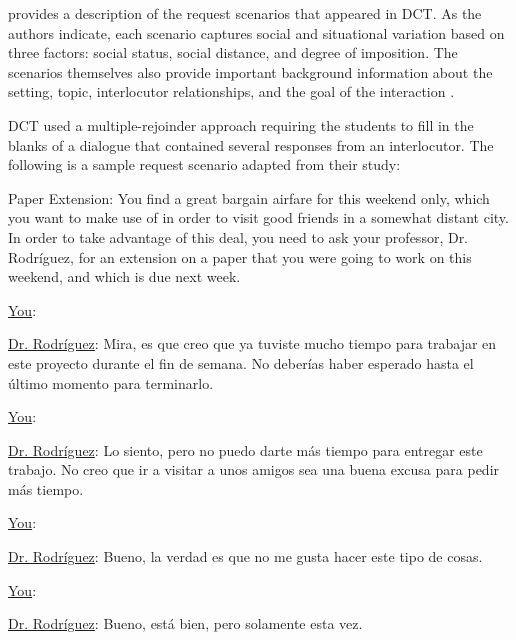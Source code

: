 \documentclass[output=paper]{langscibook}
\begin{document}
 provides a description of the request scenarios that appeared in  DCT. As the authors indicate, each scenario captures social and situational variation based on three factors: social status, social distance, and degree of imposition. The scenarios themselves also provide important background information about the setting, topic, interlocutor relationships, and the goal of the interaction \citep{Taguchi2018}.




 DCT used a multiple-rejoinder approach requiring the students to fill in the blanks of a dialogue that contained several responses from an interlocutor. The following is a sample request scenario adapted from their study:\bigskip

{\noindent
	Paper Extension: You find a great bargain airfare for this weekend only, which you want to make use of in order to visit good friends in a somewhat distant city. In order to take advantage of this deal, you need to ask your professor, Dr. Rodríguez, for an extension on a paper that you were going to work on this weekend, and which is due next week.
}
\begin{description}
	\item \ul{You}:
	\item \ul{Dr. Rodríguez}:  Mira, es que creo que ya tuviste mucho tiempo para trabajar en este proyecto durante el fin de semana.  No deberías haber esperado hasta el último momento para terminarlo.
	\item \ul{You}:
	\item \ul{Dr. Rodríguez}:  Lo siento, pero no puedo darte más tiempo para entregar este trabajo.  No creo que ir a visitar a unos amigos sea una buena excusa para pedir más tiempo.
	\item \ul{You}:
	\item \ul{Dr. Rodríguez}:  Bueno, la verdad es que no me gusta hacer este tipo de cosas.
	\item \ul{You}:
	\item \ul{Dr. Rodríguez}:  Bueno, está bien, pero solamente esta vez.
\end{description}
\end{document}

